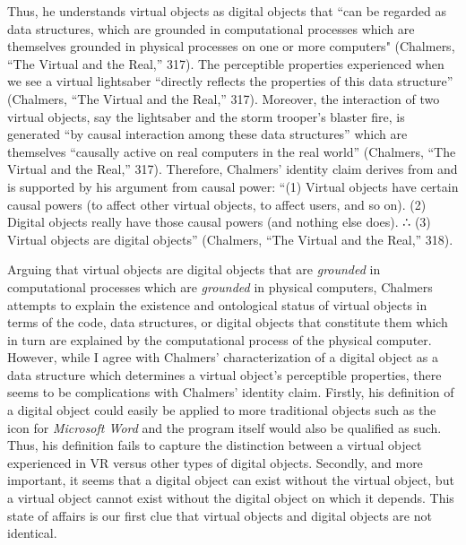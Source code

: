\documentclass{article}
\begin{document}
Thus, he understands virtual objects as digital objects that “can be regarded as data structures, which are grounded in computational processes which are themselves grounded in physical processes on one or more computers" (Chalmers, “The Virtual and the Real,” 317). The perceptible properties experienced when we see a virtual lightsaber “directly reflects the properties of this data structure” (Chalmers, “The Virtual and the Real,” 317). Moreover, the interaction of two virtual objects, say the lightsaber and the storm trooper’s blaster fire, is generated “by causal interaction among these data structures” which are themselves “causally active on real computers in the real world” (Chalmers, “The Virtual and the Real,” 317). Therefore, Chalmers’ identity claim derives from and is supported by his argument from causal power: “(1) Virtual objects have certain causal powers (to affect other virtual objects, to affect users, and so on). (2) Digital objects really have those causal powers (and nothing else does). ∴ (3) Virtual objects are digital objects” (Chalmers, “The Virtual and the Real,” 318).

Arguing that virtual objects are digital objects that are \textit{grounded} in computational processes which are \textit{grounded} in physical computers, Chalmers attempts to explain the existence and ontological status of virtual objects in terms of the code, data structures, or digital objects that constitute them which in turn are explained by the computational process of the physical computer. However, while I agree with Chalmers’ characterization of a digital object as a data structure which determines a virtual object’s perceptible properties, there seems to be complications with Chalmers’ identity claim. Firstly, his definition of a digital object could easily be applied to more traditional objects such as the icon for \textit{Microsoft Word} and the program itself would also be qualified as such. Thus, his definition fails to capture the distinction between a virtual object experienced in VR versus other types of digital objects. Secondly, and more important, it seems that a digital object can exist without the virtual object, but a virtual object cannot exist without the digital object on which it depends. This state of affairs is our first clue that virtual objects and digital objects are not identical.
\end{document}

